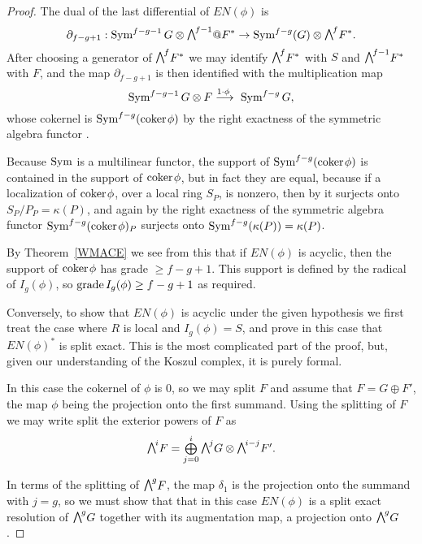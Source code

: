 \begin{proof}
The dual of the last differential of $EN(\phi)$ is
$$
\partial_{f-g+1}: \Sym^{f-g-1}G \otimes \mwedge^{f-1}@F^{*} \to
\Sym^{f-g}(G) \otimes \mwedge^{f}F^{*}.
$$
After choosing a generator of $\mwedge^{f}F^{*}$ we
may identify $\mwedge^{f}F^{*}$ with $S$ and $\mwedge^{f-1}F^{*}$ with $F$,
and the map $\partial_{f-g+1}$
is then identified with the multiplication map
$$
\Sym^{f-g-1}G \otimes F \ruto {\!1\cdot \phi} \Sym^{f-g}G
,
$$
whose cokernel is $\operatorname{Sym}^{f-g}({\rm{coker}\kern1pt} \phi)$ by the right exactness of
the symmetric algebra functor \cite[Proposition A2.2]{Eisenbud1995}. 

Because $\operatorname{Sym}$ is a multilinear functor,
the
support of $\operatorname{Sym}^{f-g}({\rm{coker}\kern1pt} \phi)$ is contained in the support
of ${\rm{coker}\kern1pt} \phi$, but in fact they are equal,
because
if a localization of
${\rm{coker}\kern1pt} \phi$, over a local ring $S_{P}$,
is nonzero, then by
it surjects onto $S_{P}/P_{P} = \kappa(P)$, and again
%
by the right exactness
of the symmetric algebra functor $\operatorname{Sym}^{f-g}({\rm{coker}\kern1pt} \phi)_{P}$ surjects
onto
$\operatorname{Sym}^{f-g}(\kappa(P)) = \kappa(P)$.

By Theorem~\ref{WMACE} we see from this that if $EN(\phi)$ is acyclic,
then the support of ${\rm{coker}\kern1pt} \phi$
has grade $\geq f-g+1$. This support is defined by the radical of
$I_{g}(\phi)$, so $\operatorname{grade} I_{g}(\phi)\geq f-g+1$ as required.

Conversely, to show that $EN(\phi)$ is acyclic under the given hypothesis
we first treat the case where $R$ is local and 
$I_{g}(\phi) = S$, and prove in this case that $EN(\phi)^{*}$ is split exact. This
is the most complicated part of the proof,
but, given our understanding of the Koszul complex, it is purely formal.

In this case the cokernel of $\phi$ is 0, so we may split $F$ and
assume that $F = G\oplus F'$, the map $\phi$ being the projection onto
the first summand. Using the splitting of $F$ we may write
split the exterior powers of $F$ as  
$$
\mwedge^{i}F =\tsty\bigoplus\limits_{j=0}^{i}\mwedge^{j}G\otimes \mwedge^{i-j}F'.
$$

In terms of the splitting of $\mwedge^{g}F$, the map $\delta_{1}$ 
is the projection onto the  summand with $j=g$, so we must show that
that in this case
 $EN(\phi)$ is a split exact resolution of $\mwedge^{g}G$ together with
 its augmentation map, a projection onto $\mwedge^{g}G$.
 

\end{proof}

